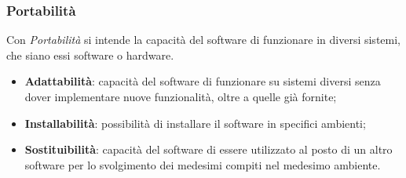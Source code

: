 \subsubsection{Portabilità}

Con \textit{Portabilità} si intende la capacità del software di funzionare in diversi sistemi, che siano essi software o hardware. 

\begin{itemize}
	\item \textbf{Adattabilità}: capacità del software di funzionare su sistemi diversi senza dover implementare nuove funzionalità, oltre a quelle già fornite;
	\item \textbf{Installabilità}: possibilità di installare il software in specifici ambienti;
	\item \textbf{Sostituibilità}: capacità del software di essere utilizzato al posto di un altro software per lo svolgimento dei medesimi compiti nel medesimo ambiente.
\end{itemize}























































